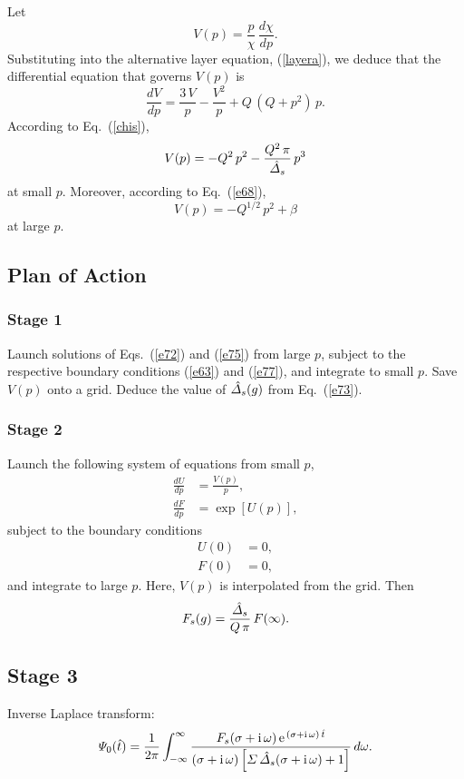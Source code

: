 \documentclass[titlepage=false,12pt]{article}
\begin{document}
Let
\begin{equation}
V(p) = \frac{p}{\chi}\,\frac{d\chi}{dp}.
\end{equation}
Substituting into the alternative layer equation, (\ref{layera}), we deduce that the differential equation that governs $V(p)$ is 
\begin{equation}\label{e75}
\frac{dV}{dp} = \frac{3\,V}{p} - \frac{V^2}{p}+Q\,(Q+p^2)\,p.
\end{equation}
According to Eq.~(\ref{chis}), 
\begin{equation}
V(p)= -Q^2\,p^2 - \frac{Q^2\,\pi}{\hat{\mit\Delta}_s}\,p^3
\end{equation}
at small $p$. Moreover, according to Eq.~(\ref{e68}), 
\begin{equation}\label{e77}
V(p) = -Q^{1/2}\,p^2+\beta
\end{equation}
at large $p$. 

\subsection{Plan of Action}
\subsubsection{Stage 1}
Launch solutions of Eqs.~(\ref{e72}) and (\ref{e75}) from large $p$, subject to the respective boundary conditions (\ref{e63}) and (\ref{e77}), and
integrate to small $p$. Save $V(p)$ onto a grid. Deduce the value of $\hat{\mit\Delta}_s(g)$ from Eq.~(\ref{e73}). 

\subsubsection{Stage 2}
Launch the following system of equations from small $p$, 
\begin{align}
\frac{dU}{dp} &= \frac{V(p)}{p},\\[0.5ex]
\frac{dF}{dp} &= \exp[U(p)],
\end{align}
subject to the boundary conditions
\begin{align}
U(0) &=0,\\[0.5ex]
F(0) &= 0,
\end{align}
and integrate to large $p$. Here, $V(p)$ is interpolated from the grid. 
Then
\begin{equation}
F_s(g) = \frac{\hat{\mit\Delta}_s}{Q\,\pi}\,F(\infty).
\end{equation}

\subsection{Stage 3}
Inverse Laplace transform:
\begin{equation}
{\mit\Psi}_0(\hat{t}) = \frac{1}{2\pi}\int_{-\infty}^{\infty}
\frac{F_s(\sigma+{\rm i}\,\omega)\,{\rm e}^{\,(\sigma+{\rm i}\,\omega)\,\hat{t}}}{(\sigma+{\rm i}\,\omega)\left[{\mit\Sigma}\,\hat{\mit\Delta}_s(\sigma+{\rm i}\,\omega)+1\right]}\,d\omega.
\end{equation}
\end{document}
